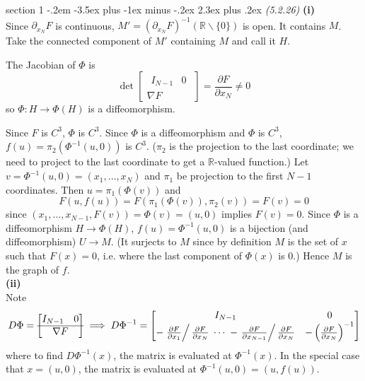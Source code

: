 \documentclass[12pt]{article}
\makeatletter
\theoremstyle{norm}
\newcommand{\R}[0]{\mathbb{R}}
\newcommand{\pa}[1]{\left( {#1} \right)}
\newcommand{\subprob}[1]{\noindent\textbf{#1}\\}
\newcommand{\pd}[2]{\frac{\partial #1}{\partial #2}}
\newcommand{\bs}[0]{\backslash}
\newcommand{\matt}[4]{
\left[
\begin{matrix}
{#1}&{#2}\\
{#3}&{#4}
\end{matrix}
\right]}
\newenvironment{problem}{\@startsection
       {section}
       {1}
       {-.2em}
       {-3.5ex plus -1ex minus -.2ex}
       {2.3ex plus .2ex}
       {\pagebreak[3]%
       \large\bf\noindent{Problem }
       }
       }
       {%
       }
\makeatother
\begin{document}
\begin{problem} {\it (5.2.26)}
\subprob{(i)}
Since $\partial_{x_N}F$ is continuous, $M'=(\partial_{x_N}F)^{-1}(\R\bs \{0\})$ is open. It contains $M$. Take the connected component of $M'$ containing $M$ and call it $H$.

The Jacobian of $\Phi$ is \[\det\left[\begin{matrix}
\begin{matrix}
I_{N-1} & 0\end{matrix}\\
\hline \nabla F\end{matrix}\right]=\pd{F}{x_N}\ne 0\]
so $\Phi:H\to \Phi(H)$ is a diffeomorphism.

Since $F$ is $C^3$, $\Phi$ is $C^3$. Since $\Phi$ is a diffeomorphism and $\Phi$ is $C^3$, $f(u)=\pi_2(\Phi^{-1}(u,0))$ is $C^3$. ($\pi_2$ is the projection to the last coordinate; we need to project to the last coordinate to get a $\R$-valued function.)  
Let $v=\Phi^{-1}(u,0)=(x_1,\ldots, x_N)$ and $\pi_1$ be projection to the first $N-1$ coordinates. Then $u=\pi_1(\Phi(v))$ and
\[
F(u,f(u))=F(\pi_1(\Phi(v)), \pi_2(v))=F(v)=0
\]
since $(x_1,\ldots, x_{N-1},F(v))=\Phi(v)=(u,0)$ implies $F(v)=0$. Since $\Phi$ is a diffeomorphism $H\to \Phi(H)$, $f(u)=\Phi^{-1}(u,0)$ is a bijection (and diffeomorphism) $U\to M$. (It surjects to $M$ since by definition $M$ is the set of $x$ such that $F(x)=0$, i.e. where the last component of $\Phi(x)$ is 0.) Hence $M$ is the graph of $f$. \\

\subprob{(ii)}
Note
\begin{equation}\label{p5-4-1}
D\Phi=\left[\begin{matrix}
\begin{matrix}
I_{N-1} & 0\end{matrix}\\
\hline \nabla F\end{matrix}\right]
\implies
D\Phi^{-1}=
\matt{I_{N-1}}{0}
{-\left.\pd{F}{x_1}\right/\pd{F}{x_N}\;\cdots \;-\left.\pd{F}{x_{N-1}}\right/\pd{F}{x_N}}{-\pa{\pd{F}{x_N}}^{-1}}
\end{equation}
where to find $D\Phi^{-1}(x)$, the matrix is evaluated at $\Phi^{-1}(x)$. In the special case that $x=(u,0)$, the matrix is evaluated at $\Phi^{-1}(u,0)=(u, f(u))$.


\end{problem}
\end{document}
